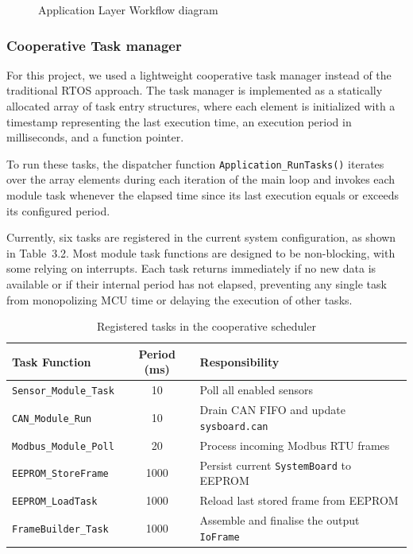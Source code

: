 \begin{figure}[H]
\begin{tikzpicture}[node distance=1.8cm, every node/.style={align=center}]
    \end{tikzpicture}
    \caption{Application Layer Workflow diagram}
    \label{fig:app_flow}
\end{figure}

\subsubsection{Cooperative Task manager}

For this project, we used a lightweight cooperative task manager instead of the traditional RTOS approach. The task manager is implemented as a statically allocated array of task entry structures, where each element is initialized with a timestamp representing the last execution time, an execution period in milliseconds, and a function pointer.

To run these tasks, the dispatcher function \texttt{Application\_RunTasks()} iterates over the array elements during each iteration of the main loop and invokes each module task whenever the elapsed time since its last execution equals or exceeds its configured period.

Currently, six tasks are registered in the current system configuration, as shown in Table~3.2. Most module task functions are designed to be non-blocking, with some relying on interrupts. Each task returns immediately if no new data is available or if their internal period has not elapsed, preventing any single task from monopolizing MCU time or delaying the execution of other tasks.
\begin{table}[H]
    \centering
    \caption{Registered tasks in the cooperative scheduler}
    \label{tab:task_schedule}
    \begin{tabular}{|l|c|l|}
        \hline
        \textbf{Task Function} & \textbf{Period (ms)} & \textbf{Responsibility} \\
        \hline
        \texttt{Sensor\_Module\_Task}  & 10   & Poll all enabled sensors \\
        \hline
        \texttt{CAN\_Module\_Run}   & 10   & Drain CAN FIFO and update \texttt{sysboard.can} \\
        \hline
        \texttt{Modbus\_Module\_Poll} & 20  & Process incoming Modbus RTU frames \\
        \hline
        \texttt{EEPROM\_StoreFrame}  & 1000 & Persist current \texttt{SystemBoard} to EEPROM \\
        \hline
        \texttt{EEPROM\_LoadTask}    & 1000 & Reload last stored frame from EEPROM \\
        \hline
        \texttt{FrameBuilder\_Task}    & 1000 & Assemble and finalise the output \texttt{IoFrame} \\
        \hline
    \end{tabular}
\end{table}

